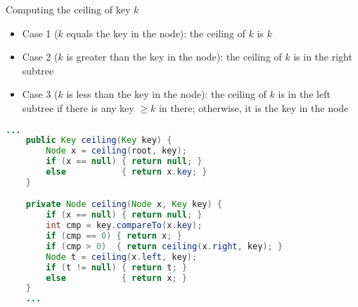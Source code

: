 \documentclass[8pt,a4paper,compress]{beamer}
\begin{document}
\begin{frame}[fragile]
Computing the ceiling of key $k$
\begin{itemize}
\item Case 1 ($k$ equals the key in the node): the ceiling of $k$ is $k$

\item Case 2 ($k$ is greater than the key in the node): the ceiling of $k$ is in the right subtree

\item Case 3 ($k$ is less than the key in the node): the ceiling of $k$ is in the left subtree if there is any key $\geq k$ in there; otherwise, it is the key in the node
\end{itemize}

\begin{lstlisting}[language=Java]
    ...
    public Key ceiling(Key key) {
        Node x = ceiling(root, key);
        if (x == null) { return null; }
        else           { return x.key; }
    }

    private Node ceiling(Node x, Key key) {
        if (x == null) { return null; }
        int cmp = key.compareTo(x.key);
        if (cmp == 0) { return x; }
        if (cmp > 0)  { return ceiling(x.right, key); }
        Node t = ceiling(x.left, key); 
        if (t != null) { return t; }
        else           { return x; }
    } 
    ...
\end{lstlisting}
\end{frame}

\begin{frame}[fragile]
Rank and selection

\begin{center}
\texttt{[image: \{./figures/bst\_rank\_select]}.pdf}
\end{center}

\begin{lstlisting}[language=Java]
    ...
    public int rank(Key key) { return rank(key, root); } 

    private int rank(Key key, Node x) {
        if (x == null) { return 0; }
        int cmp = key.compareTo(x.key); 
        if      (cmp < 0) { return rank(key, x.left); }
        else if (cmp > 0) { return 1 + size(x.left) + rank(key, x.right); }
        else              { return size(x.left); }
    } 

    public Key select(int k) {
        if (k < 0 || k >= size()) { return null; }
        Node x = select(root, k);
        return x.key;
    }

    private Node select(Node x, int k) {
        if (x == null) { return null; } 
        int t = size(x.left); 
        if      (t > k) { return select(x.left,  k); }
        else if (t < k) { return select(x.right, k - t - 1); } 
        else            { return x; }
    } 
    ...
\end{lstlisting}
\end{frame}
\end{document}
